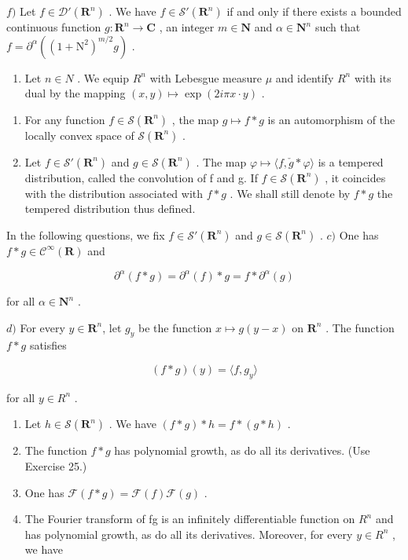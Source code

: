 \(f)\) Let \(f \in \mathcal{D}'(\mathbf{R}^n)\) . We have \(f \in \mathcal{S}'(\mathbf{R}^n)\) if and only if there exists a bounded continuous function \(g\colon \mathbf{R}^n \to \mathbf{C}\) , an integer \(m \in \mathbf{N}\) and \(\alpha \in \mathbf{N}^n\) such that \(f = \partial^\alpha((1 + \mathrm{N}^2)^{m/2}g)\) .

\begin{enumerate}
\def\labelenumi{\arabic{enumi})}
\setcounter{enumi}{25}
\tightlist
\item
  Let \(n \in N\) . We equip \(R^{n}\) with Lebesgue measure \(\mu\) and identify \(R^{n}\) with its dual by the mapping \((x, y) \mapsto \exp(2i\pi x \cdot y)\) .
\end{enumerate}

\begin{enumerate}
\def\labelenumi{\alph{enumi})}
\item
  For any function \(f \in \mathcal{S}(\mathbf{R}^n)\) , the map \(g \mapsto f * g\) is an automorphism of the locally convex space of \(\mathcal{S}(\mathbf{R}^n)\) .
\item
  Let \(f \in \mathcal{S}'(\mathbf{R}^{n})\) and \(g \in \mathcal{S}(\mathbf{R}^{n})\) . The map \(\varphi \mapsto \langle f, \check{g} * \varphi \rangle\) is a tempered distribution, called the convolution of f and g. If \(f \in \mathcal{S}(\mathbf{R}^{n})\) , it coincides with the distribution associated with \(f * g\) . We shall still denote by \(f * g\) the tempered distribution thus defined.
\end{enumerate}

In the following questions, we fix \(f \in \mathcal{S}'(\mathbf{R}^n)\) and \(g \in \mathcal{S}(\mathbf{R}^n)\) . \(c)\) One has \(f * g \in \mathcal{C}^\infty(\mathbf{R})\) and

\[
\partial^ {\alpha} (f * g) = \partial^ {\alpha} (f) * g = f * \partial^ {\alpha} (g)
\]

for all \(\alpha\in\mathbf{N}^{n}\) .

\(d)\) For every \(y \in \mathbf{R}^n\), let \(g_y\) be the function \(x \mapsto g(y - x)\) on \(\mathbf{R}^n\) . The function \(f * g\) satisfies

\[
(f * g) (y) = \langle f, g _ {y} \rangle
\]

for all \(y \in R^{n}\) .

\begin{enumerate}
\def\labelenumi{\alph{enumi})}
\setcounter{enumi}{4}
\item
  Let \(h \in \mathcal{S}(\mathbf{R}^n)\) . We have \((f*g)*h = f*(g*h)\) .
\item
  The function \(f*g\) has polynomial growth, as do all its derivatives. (Use Exercise 25.)
\item
  One has \(\mathcal{F}(f*g) = \mathcal{F}(f)\mathcal{F}(g)\) .
\item
  The Fourier transform of fg is an infinitely differentiable function on \(R^{n}\) and has polynomial growth, as do all its derivatives. Moreover, for every \(y \in R^{n}\) , we have
\end{enumerate}


